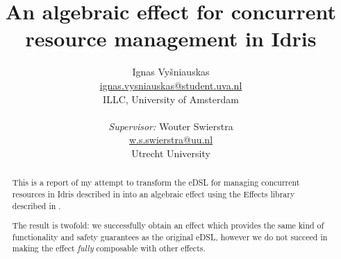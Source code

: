 \documentclass{article}
\title{An algebraic effect for concurrent resource management in Idris}
\author{Ignas Vyšniauskas \\ \url{ignas.vysniauskas@student.uva.nl} \\
        ILLC, University of Amsterdam \\
    \\ \textit{Supervisor:} Wouter Swierstra
    \\ \url{w.s.swierstra@uu.nl}
    \\ Utrecht University
}
\begin{document}
\maketitle

\begin{abstract}
    This is a report of my attempt to transform the eDSL for managing
    concurrent resources in Idris described in \cite{cbconc-fi} into an
    algebraic effect using the Effects library described in \cite{effects-idr}.

    The result is twofold: we successfully obtain an effect which provides the
    same kind of functionality and safety guarantees as the original eDSL,
    however we do not succeed in making the effect \emph{fully} composable with
    other effects.
\end{abstract}









\end{document}
